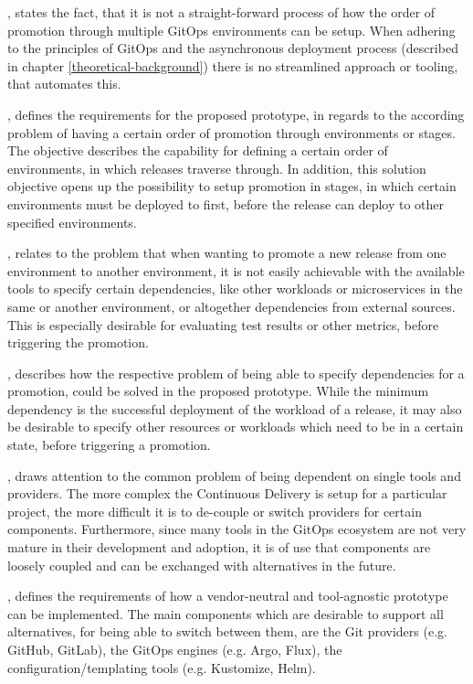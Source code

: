 ,
states the fact, that it is not a straight-forward process of how the order of promotion
through multiple GitOps environments can be setup. When adhering to the principles of GitOps
and the asynchronous deployment process (described in chapter \ref{theoretical-background})
there is no streamlined approach or tooling, that automates this.

,
defines the requirements for the proposed prototype,
in regards to the according problem of having a certain order of promotion through environments or stages.
The objective describes the capability for defining a certain order of environments, in which releases traverse through.
In addition, this solution objective opens up the possibility to setup promotion in stages, in which
certain environments must be deployed to first, before the release can deploy to other specified environments.

,
relates to the problem that when wanting to promote a new release from one environment to another environment,
it is not easily achievable with the available tools to specify certain dependencies, like other workloads or
microservices in the same or another environment, or altogether dependencies from external sources.
This is especially desirable for evaluating test results or other metrics, before triggering the promotion.

,
describes how the respective problem of being able to specify dependencies for a promotion,
could be solved in the proposed prototype. While the minimum dependency is the successful deployment
of the workload of a release,
it may also be desirable to specify other resources or workloads which need to be in a certain state,
before triggering a promotion.

,
draws attention to the common problem of being dependent on single tools and providers.
The more complex the Continuous Delivery is setup for a particular project,
the more difficult it is to de-couple or switch providers for certain components.
Furthermore, since many tools in the GitOps ecosystem are not very mature in their development and adoption,
it is of use that components are loosely coupled and can be exchanged with alternatives in the future.

,
defines the requirements of how a vendor-neutral and tool-agnostic prototype can be implemented.
The main components which are desirable to support all alternatives,
for being able to switch between them,
are the Git providers (e.g. GitHub, GitLab),
the GitOps engines (e.g. Argo, Flux),
the configuration/templating tools (e.g. Kustomize, Helm).

